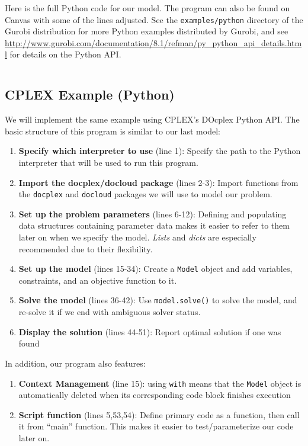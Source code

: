 \documentclass[12pt]{article}
\begin{document}
Here is the full Python code for our model. The program can also be found on Canvas with some of the lines adjusted. See the \texttt{examples/python} directory of the Gurobi distribution for more Python examples distributed by Gurobi, and see \url{http://www.gurobi.com/documentation/8.1/refman/py_python_api_details.html} for details on the Python API.
\inputminted[fontsize=\small,linenos]{python}{code/shortlines/TWTgurobi.py}

\subsection{CPLEX Example (Python)}
We will implement the same example using CPLEX's DOcplex Python API. The basic structure of this program is similar to our last model:
\begin{enumerate}
    \item \textbf{Specify which interpreter to use} (line 1): Specify the path to the Python interpreter that will be used to run this program.
    \item \textbf{Import the docplex/docloud package} (lines 2-3): Import functions from the \texttt{docplex} and \texttt{docloud} packages we will use to model our problem.
    \item \textbf{Set up the problem parameters} (lines 6-12): Defining and populating data structures containing parameter data makes it easier to refer to them later on when we specify the model. \emph{Lists} and \emph{dicts} are especially recommended due to their flexibility.
    \item \textbf{Set up the model} (lines 15-34): Create a \texttt{Model} object and add variables, constraints, and an objective function to it.
    \item \textbf{Solve the model} (lines 36-42): Use \texttt{model.solve()} to solve the model, and re-solve it if we end with ambiguous solver status.
    \item \textbf{Display the solution} (lines 44-51): Report optimal solution if one was found
\end{enumerate}
In addition, our program also features:
\begin{enumerate}
    \item \textbf{Context Management} (line 15): using \texttt{with} means that the \texttt{Model} object is automatically deleted when its corresponding code block finishes execution
    \item \textbf{Script function} (lines 5,53,54): Define primary code as a function, then call it from ``main'' function. This makes it easier to test/parameterize our code later on.
\end{enumerate}
\end{document}
